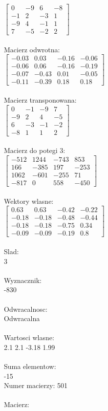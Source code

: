 \documentclass[a4paper,12pt]{article}
\begin{document}
$\begin{bmatrix} 0&-9&6&-8\\-1&2&-3&1\\-9&4&-1&1\\7&-5&-2&2 \end{bmatrix}$
\\
\\
Macierz odwrotna:\\

$\begin{bmatrix} -0.03&0.03&-0.16&-0.06\\-0.06&0.06&-0.16&-0.19\\-0.07&-0.43&0.01&-0.05\\-0.11&-0.39&0.18&0.18 \end{bmatrix}$
\\
\\
Macierz transponowana:\\

$\begin{bmatrix} 0&-1&-9&7\\-9&2&4&-5\\6&-3&-1&-2\\-8&1&1&2 \end{bmatrix}$
\\
\\
Macierz do potegi 3:\\

$\begin{bmatrix} -512&1244&-743&853\\166&-385&197&-253\\1062&-601&-255&71\\-817&0&558&-450 \end{bmatrix}$
\\
\\
Wektory wlasne:\\

$\begin{bmatrix} 0.63&0.63&-0.42&-0.22\\-0.18&-0.18&-0.48&-0.44\\-0.18&-0.18&-0.75&0.34\\-0.09&-0.09&-0.19&0.8 \end{bmatrix}$
\\
\\
Slad:\\
3
\\
\\
Wyznacznik:\\
-830
\\
\\
Odwracalnosc:\\
Odwracalna
\\
\\
Wartosci wlasne:\\
2.1 2.1 -3.18 1.99
\\
\\
Suma elementow:\\
-15
\\
\newpage
Numer macierzy:
501
\\
\\
Macierz:\\
\end{document}
